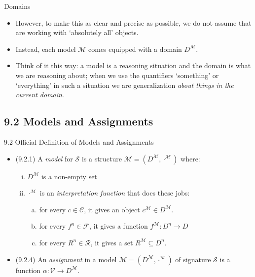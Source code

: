 \begin{frame}{Domains}

	\begin{itemize}%
	\itemsep=16pt
	
		\item However, to make this as clear and precise as possible, we do not assume that are working with `absolutely all' objects.
		
		\item Instead, each model $\mathcal{M}$ comes equipped with a domain $D^\mathcal{M}$.
		
		\item Think of it this way: a model is a reasoning situation and the domain is what we are reasoning about; when we use the quantifiers `something' or `everything' in such a situation we are generalization \emph{about things in the current domain}.
			
	\end{itemize}

\end{frame}

\subsection{9.2 Models and Assignments}

\begin{frame}{9.2 Official Definition of Models and Assignments}

	\begin{itemize}%
	\itemsep=16pt
		
		\item (9.2.1) A \emph{model} for $\mathcal{S}$ is a structure $\mathcal{M}=(D^\mathcal{M},\cdot^\mathcal{M})$ where:
		\begin{enumerate}[(i)]
		
			\item $D^\mathcal{M}$ is a non-empty set
			
			\item $\cdot^\mathcal{M}$ is an \emph{interpretation function} that does these jobs:
			\begin{enumerate}[(a)]
			
				\item for every $c\in\mathcal{C}$, it gives an object $c^\mathcal{M}\in D^\mathcal{M}$.

				\item for every $f^n\in\mathcal{F}$, it gives a function $f^\mathcal{M}:D^n\to D$

				\item for every $R^n\in\mathcal{R}$, it gives a set $R^\mathcal{M}\subseteq D^n$.
			
			\end{enumerate}
		\end{enumerate}

		\item (9.2.4) An \emph{assignment} in a model $\mathcal{M}=(D^\mathcal{M},\cdot^\mathcal{M})$ of signature $\mathcal{S}$ is a function $\alpha:\mathcal{V}\to D^\mathcal{M}$. 

	\end{itemize}

\end{frame}

